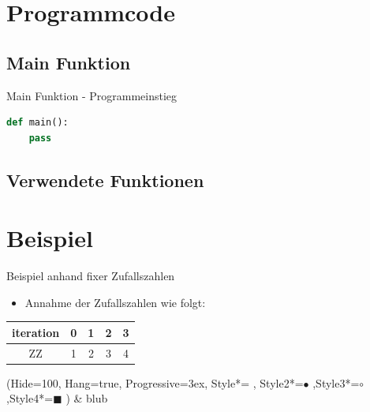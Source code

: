 \section{Programmcode}
\subsection{Main Funktion}
\begin{frame}[fragile]{Main Funktion - Programmeinstieg}
  \begin{lstlisting}[language=python]
def main():
	pass
\end{lstlisting}
\logopythonbottom
\end{frame}

\subsection{Verwendete Funktionen}
%
%
%

\section{Beispiel}
\begin{frame}[fragile]{Beispiel anhand fixer Zufallszahlen}
\begin{itemize}
\item Annahme der Zufallszahlen wie folgt:
\end{itemize}
\begin{center}
  \begin{tabular}{c|c|c|c|c}
  \hline 
  iteration & 0 & 1 & 2 & 3\\ 
  \hline 
  ZZ      & 1 & 2 & 3 & 4 \\ 
  \end{tabular} 
\end{center}
\begin{easylist}
\ListProperties(Hide=100, Hang=true, Progressive=3ex, Style*= ,
Style2*=$\bullet$ ,Style3*=$\circ$ ,Style4*=\tiny$\blacksquare$ )
& blub
\end{easylist}
\end{frame}


